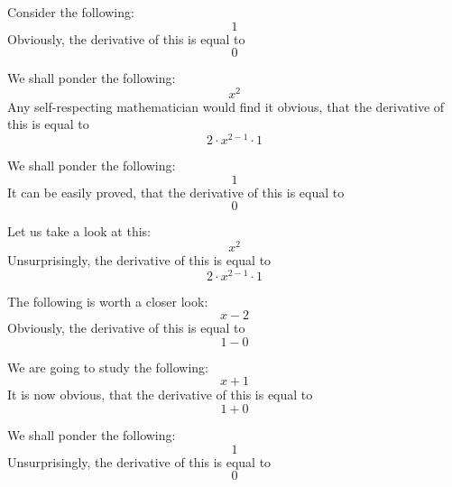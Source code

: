 \documentclass{article}
\begin{document}
Consider the following:
\begin{equation}
1 
\end{equation}
Obviously, the derivative of this is equal to
\begin{equation}
0 
\end{equation}

We shall ponder the following:
\begin{equation}
x ^{2 } 
\end{equation}
Any self-respecting mathematician would find it obvious, that the derivative of this is equal to
\begin{equation}
2 \cdot x ^{2 - 1 } \cdot 1 
\end{equation}

We shall ponder the following:
\begin{equation}
1 
\end{equation}
It can be easily proved, that the derivative of this is equal to
\begin{equation}
0 
\end{equation}

Let us take a look at this:
\begin{equation}
x ^{2 } 
\end{equation}
Unsurprisingly, the derivative of this is equal to
\begin{equation}
2 \cdot x ^{2 - 1 } \cdot 1 
\end{equation}

The following is worth a closer look:
\begin{equation}
x - 2 
\end{equation}
Obviously, the derivative of this is equal to
\begin{equation}
1 - 0 
\end{equation}

We are going to study the following:
\begin{equation}
x + 1 
\end{equation}
It is now obvious, that the derivative of this is equal to
\begin{equation}
1 + 0 
\end{equation}

We shall ponder the following:
\begin{equation}
1 
\end{equation}
Unsurprisingly, the derivative of this is equal to
\begin{equation}
0 
\end{equation}
\end{document}
